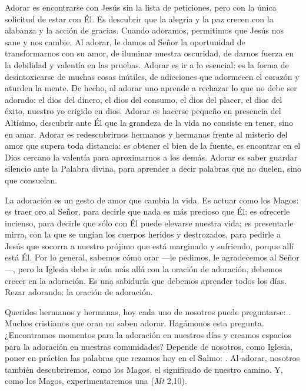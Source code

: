 {Adorar es encontrarse con Jesús sin la lista de peticiones, pero con la única solicitud de estar con Él. Es descubrir que la alegría y la paz crecen con la alabanza y la acción de gracias. Cuando adoramos, permitimos que Jesús nos sane y nos cambie. Al adorar, le damos al Señor la oportunidad de transformarnos con su amor, de iluminar nuestra oscuridad, de darnos fuerza en la debilidad y valentía en las pruebas. Adorar es ir a lo esencial: es la forma de desintoxicarse de muchas cosas inútiles, de adicciones que adormecen el corazón y aturden la mente. De hecho, al adorar uno aprende a rechazar lo que no debe ser adorado: el dios del dinero, el dios del consumo, el dios del placer, el dios del éxito, nuestro yo erigido en dios. Adorar es hacerse pequeño en presencia del Altísimo, descubrir ante Él que la grandeza de la vida no consiste en tener, sino en amar. Adorar es redescubrirnos hermanos y hermanas frente al misterio del amor que supera toda distancia: es obtener el bien de la fuente, es encontrar en el Dios cercano la valentía para aproximarnos a los demás. Adorar es saber guardar silencio ante la Palabra divina, para aprender a decir palabras que no duelen, sino que consuelan.

La adoración es un gesto de amor que cambia la vida. Es actuar como los Magos: es traer oro al Señor, para decirle que nada es más precioso que Él; es ofrecerle incienso, para decirle que sólo con Él puede elevarse nuestra vida; es presentarle mirra, con la que se ungían los cuerpos heridos y destrozados, para pedirle a Jesús que socorra a nuestro prójimo que está marginado y sufriendo, porque allí está Él. Por lo general, sabemos cómo orar ---le pedimos, le agradecemos al Señor---, pero la Iglesia debe ir aún más allá con la oración de adoración, debemos crecer en la adoración. Es una sabiduría que debemos aprender todos los días. Rezar adorando: la oración de adoración.

Queridos hermanos y hermanas, hoy cada uno de nosotros puede preguntarse: . Muchos cristianos que oran no saben adorar. Hagámonos esta pregunta. ¿Encontramos momentos para la adoración en nuestros días y creamos espacios para la adoración en nuestras comunidades? Depende de nosotros, como Iglesia, poner en práctica las palabras que rezamos hoy en el Salmo: . Al adorar, nosotros también descubriremos, como los Magos, el significado de nuestro camino. Y, como los Magos, experimentaremos una  (\emph{Mt} 2,10).



}
